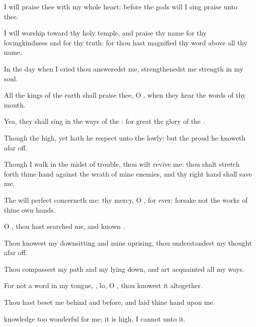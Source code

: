{\Q {}I will
praise thee with my whole
heart: before the
gods will I sing
praise unto thee.


\par }{\Q {}I will
worship toward thy
holy
temple, and
praise thy
name for thy
lovingkindness and for thy
truth: for thou hast
magnified thy
word above all thy
name.


\par }{\Q {}In the
day when I
cried thou
answeredst me,
{}
strengthenedst me
{}
strength in my
soul.


\par }{\Q {}All the
kings of the
earth shall
praise thee, O
{}, when they
hear the
words of thy
mouth.


\par }{\Q {}Yea, they shall
sing in the
ways of the
{}: for
great
{} the
glory of the
{}.


\par }{\BB \par }
{\Q {}Though the
{}
{}
high, yet hath he
respect unto the
lowly: but the
proud he
knoweth afar
off.


\par }{\Q {}Though I
walk in the
midst of
trouble, thou wilt
revive me: thou shalt stretch
forth thine
hand against the
wrath of mine
enemies, and thy right
hand shall
save me.


\par }{\Q {}The
{} will
perfect
{} concerneth me: thy
mercy, O
{},
{} for
ever:
forsake not the
works of thine own
hands.




\par }
{\Q {}O
{}, thou hast
searched me, and
known
{}.


\par }{\Q {}Thou
knowest my
downsitting and mine
uprising, thou
understandest my
thought afar
off.


\par }{\Q {}Thou
compassest my
path and my lying
down, and art
acquainted
{} all my
ways.


\par }{\Q {}For
{} not a
word in my
tongue,
{}, lo, O
{}, thou
knowest it altogether.


\par }{\Q {}Thou hast
beset me
behind and
before, and
laid thine
hand upon me.


\par }{\Q {}
knowledge
{} too
wonderful for me; it is
high, I
cannot
{} unto it.


\par }{\BB \par }
